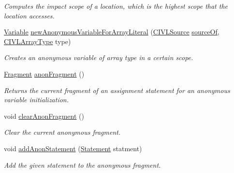 \begin{DoxyCompactItemize}
\begin{DoxyCompactList}\small\item\em Computes the impact scope of a location, which is the highest scope that the location accesses. \end{DoxyCompactList}\item 
\hyperlink{interfaceedu_1_1udel_1_1cis_1_1vsl_1_1civl_1_1model_1_1IF_1_1variable_1_1Variable}{Variable} \hyperlink{interfaceedu_1_1udel_1_1cis_1_1vsl_1_1civl_1_1model_1_1IF_1_1ModelFactory_a2a7bdf8d4d0ab5fb7ebcc57712fae763}{new\+Anonymous\+Variable\+For\+Array\+Literal} (\hyperlink{interfaceedu_1_1udel_1_1cis_1_1vsl_1_1civl_1_1model_1_1IF_1_1CIVLSource}{C\+I\+V\+L\+Source} \hyperlink{interfaceedu_1_1udel_1_1cis_1_1vsl_1_1civl_1_1model_1_1IF_1_1ModelFactory_a560445f5ed48add351aa4b2f120f0c8e}{source\+Of}, \hyperlink{interfaceedu_1_1udel_1_1cis_1_1vsl_1_1civl_1_1model_1_1IF_1_1type_1_1CIVLArrayType}{C\+I\+V\+L\+Array\+Type} type)
\begin{DoxyCompactList}\small\item\em Creates an anonymous variable of array type in a certain scope. \end{DoxyCompactList}\item 
\hyperlink{interfaceedu_1_1udel_1_1cis_1_1vsl_1_1civl_1_1model_1_1IF_1_1Fragment}{Fragment} \hyperlink{interfaceedu_1_1udel_1_1cis_1_1vsl_1_1civl_1_1model_1_1IF_1_1ModelFactory_a4cb450eca9976c7f907bd8ca17e2f1bf}{anon\+Fragment} ()
\begin{DoxyCompactList}\small\item\em Returns the current fragment of an assignment statement for an anonymous variable initialization. \end{DoxyCompactList}\item 
void \hyperlink{interfaceedu_1_1udel_1_1cis_1_1vsl_1_1civl_1_1model_1_1IF_1_1ModelFactory_a677b0fc41ab80386339c42367fefdcbf}{clear\+Anon\+Fragment} ()
\begin{DoxyCompactList}\small\item\em Clear the current anonymous fragment. \end{DoxyCompactList}\item 
void \hyperlink{interfaceedu_1_1udel_1_1cis_1_1vsl_1_1civl_1_1model_1_1IF_1_1ModelFactory_a9d925fae4395bf309d3584233f7e4daa}{add\+Anon\+Statement} (\hyperlink{interfaceedu_1_1udel_1_1cis_1_1vsl_1_1civl_1_1model_1_1IF_1_1statement_1_1Statement}{Statement} statment)
\begin{DoxyCompactList}\small\item\em Add the given statement to the anonymous fragment. \end{DoxyCompactList}\item 

\end{DoxyCompactItemize}
